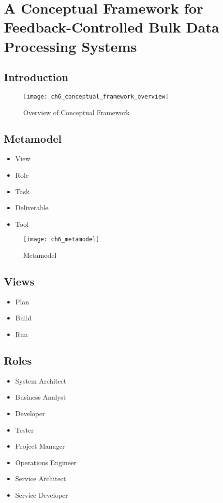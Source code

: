 

\chapter[Conceptual Framework]{A Conceptual Framework for Feedback-Controlled Bulk Data Processing Systems}\label{ch:conceptual_framework}


\section{Introduction} 
\begin{figure}
	[htpb] \centering 
	\texttt{[image: ch6\_conceptual\_framework\_overview]} \caption{Overview of Conceptual Framework} \label{fig:ch6_conceptional_framework_overview} 
\end{figure}

\section{Metamodel} 
\begin{itemize}
	\item View
	\item Role
	\item Task
	\item Deliverable
	\item Tool
\end{itemize}

\begin{figure}
	[htpb] \centering 
	\texttt{[image: ch6\_metamodel]} 
	\caption{Metamodel} 
	\label{fig:ch6_metamodel} 
\end{figure}

\section{Views}
\begin{itemize}
	\item Plan
	\item Build
	\item Run
\end{itemize}

\section{Roles} 
\begin{itemize}
	\item System Architect 
	\item Business Analyst 
	\item Developer 
	\item Tester 
	\item Project Manager 
	\item Operations Engineer 
	\item Service Architect 
	\item Service Developer
\end{itemize}

